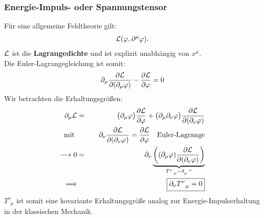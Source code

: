 \subsubsection{Energie-Impuls- oder Spannungstensor}
Für eine allgemeine Feldtheorie gilt:
\begin{eqnarray*}
\mathcal L(\varphi,\partial^{\mu}\varphi).
\end{eqnarray*}
$\mathcal L$ ist die {\bf Lagrangedichte} und ist explizit unabhängig von $x^{\mu}$.\\
Die Euler-Lagrangegleichung ist somit:
\begin{eqnarray*}
\partial_{\mu} \frac{\partial \mathcal L}{\partial(\partial_{\mu} \varphi)} - \frac{\partial \mathcal L}{\partial \varphi} = 0
\end{eqnarray*}
Wir betrachten die Erhaltungsgrößen:
\begin{eqnarray*}\nonumber
\partial _{\mu} \mathcal L &=& \big(\partial _{\mu}\varphi\big) \frac{\partial \mathcal L}{\partial \varphi} + \big(\partial_{\mu}\partial_{\nu}\varphi\big) \frac{\partial \mathcal L}{\partial(\partial_{\nu} \varphi)}\\ \nonumber
\text{mit } &{}&\quad \partial_{\nu} \frac{\partial \mathcal L}{\partial(\partial_{\nu}\varphi)} = \frac{ \partial \mathcal L}{\partial \varphi}\quad \text{Euler-Lagrange}\\ \nonumber
\longrightarrow 0 &=& \partial_{ \nu } \underbrace{\left((\partial _{\mu}\varphi)\frac{\partial \mathcal L}{\partial(\partial_{\nu} \varphi)}\right)}_{T_{\ \ \mu}^{\nu}- \delta_{\mu}^{\ \ \nu}}\\ \label{eq:4}
\Longrightarrow &{}&\boxed{\partial_{\nu} T_{\ \ \mu}^{\nu} = 0}
\end{eqnarray*}
$T_{\ \ \mu}^{\nu}$ ist somit eine kovariante Erhaltungsgröße analog zur Energie-Impulserhaltung in der klassischen Mechanik.\vspace{1.5cm}



